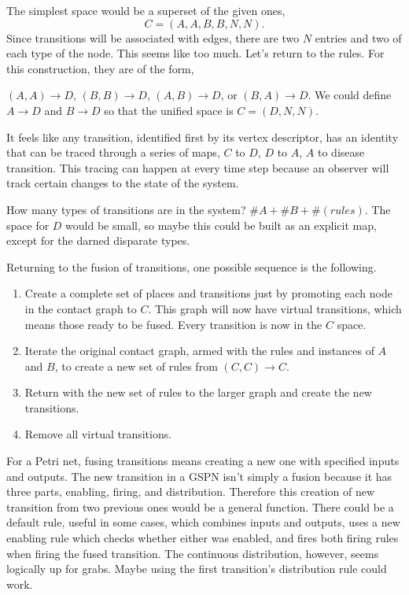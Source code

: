 \documentclass{article}
\begin{document}
The simplest space would be a superset of the given ones,
\begin{equation}
C=(A,A,B,B,N,N).
\end{equation}
Since transitions will be associated with edges,
there are two $N$ entries and two of each type of the node.
This seems like too much. Let's return to the rules. For this
construction, they are of the form,

$(A,A)\rightarrow D$, $(B,B)\rightarrow D$, $(A,B)\rightarrow D$,
or $(B,A)\rightarrow D$. We could define $A \rightarrow D$ and $B \rightarrow D$ so
that the unified space is $C=(D,N,N)$.

It feels like any transition, identified first by its vertex
descriptor, has an identity that can be traced through a series
of maps, $C$ to $D$, $D$ to $A$, $A$ to disease transition.
This tracing can happen at every time step because an observer will
track certain changes to the state of the system.

How many types of transitions are in the system?
$\#A+\#B+\#(rules)$. The space for $D$ would be small, so maybe
this could be built as an explicit map, except for the darned
disparate types.

Returning to the fusion of transitions, one possible sequence is
the following.

\begin{enumerate}
\item Create a complete set of places and transitions just by promoting
each node in the contact graph to $C$. This graph will now have
virtual transitions, which means those ready to be fused. Every 
transition is now in the $C$ space.

\item Iterate the original contact graph, armed with the rules
and instances of $A$ and $B$, to create a new set of rules
from $(C,C) → C$.

\item Return with the new set of rules to the larger graph and
create the new transitions.

\item Remove all virtual transitions.
\end{enumerate}

For a Petri net, fusing transitions means creating a new one
with specified inputs and outputs. The new transition in a GSPN
isn't simply a fusion because it has three parts, enabling, firing,
and distribution. Therefore this creation of new transition
from two previous ones would be a general function. There could
be a default rule, useful in some cases, which combines inputs
and outputs, uses a new enabling rule which checks whether either
was enabled, and fires both firing rules when firing the fused
transition. The continuous distribution, however, seems logically
up for grabs. Maybe using the first transition's distribution
rule could work.
\end{document}
